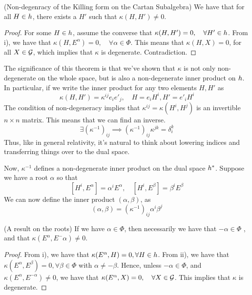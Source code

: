 \begin{thm}{(Non-degenracy of the Killing form on the Cartan Subalgebra)} 
	We have that for all $ H \in h $, there exists 
	a $ H ' $ such that $ \kappa ( H , H ' ) \neq 0 $. 
\begin{proof}
	For some $ H \in h $, assume the converse that 
	$ \kappa ( H , H ' ) = 0 , \quad \forall H ' \in h  $. 
	From i), we have that $ \kappa ( H , E ^ \alpha) = 0 , \quad \forall \alpha \in 
	\Phi $. This means that $ \kappa ( H , X )  = 0 $, for all 
	$ X \in \mathcal{ G } $, which implies that $ \kappa $ is degenerate. 
	Contradiction. 
\end{proof}
The significance of this theorem is that 
we've shown that $ \kappa $ is not only non-degenerate on the whole space, 
but is also a non-degenerate inner product on $ h $. 
In particular, if we write the inner product for any two 
elements $ H , H ' $ as 
\[
 \kappa ( H , H' ) = \kappa ^{ ij } e _ i e' _ j, \quad H = e_ i H ^ i, H ' = e ' _ i H ^ i  
\]  The condition of non-degeneracy implies that 
$ \kappa ^{ ij }  = \kappa ( H ^ i , H ^j ) $ is an invertible $ n \times n $ 
matrix. This means that we can find an inverse. 
\[
	\exists ( \kappa ^{ -1 } )_{ ij } \implies ( \kappa ^{ - 1} ) _{ ij } \kappa ^{ jk} 
	 = \delta ^ k _ i 
\] Thus, like in general relativity, it's natural to think 
about lowering indices and transferring things over to the dual space. 
\end{thm}
Now, $ \kappa ^{ -1 }  $ defines a non-degenerate inner product 
on the dual space $ h ^ * $. Suppose we have a root $ \alpha $ so 
that 
\[
 [ H ^ i , E ^ \alpha ] = \alpha ^ i E ^ \alpha, \quad [ H ^ i, E ^ \beta ] = \beta ^i E ^ \beta 
\] We can now define the inner product $ ( \alpha, \beta ) $, as 
\[
	( \alpha, \beta ) = ( \kappa ^{ - 1} ) _{ ij} \alpha ^ i \beta ^ j 
\] 
\begin{thm}{(A result on the roots)} 
	If we have $ \alpha \in \Phi $, then necessarily we have that
	$ - \alpha \in \Phi $ , and that $ \kappa ( E ^ \alpha , E ^ - \alpha ) \neq 0$. 

\begin{proof}
	From i), we have that $ \kappa ( E ^ \alpha , H )   = 0 , \forall H \in h $. 
	From ii), we have that $ \kappa ( E ^ \alpha , E ^ \beta )  = 0, \forall 
	\beta \in \Phi $ with $ \alpha \neq - \beta $. 
	Hence, unless $ - \alpha \in \Phi $, and $ \kappa ( E ^ \alpha , E ^{ - \alpha }  ) \neq 0 $, 
	we have that  $ \kappa ( E ^ \alpha , X ) = 0 , \quad \forall X \in \mathcal{ G } $. This
	implies that $ \kappa $ is degenerate. 
\end{proof}
\end{thm}

